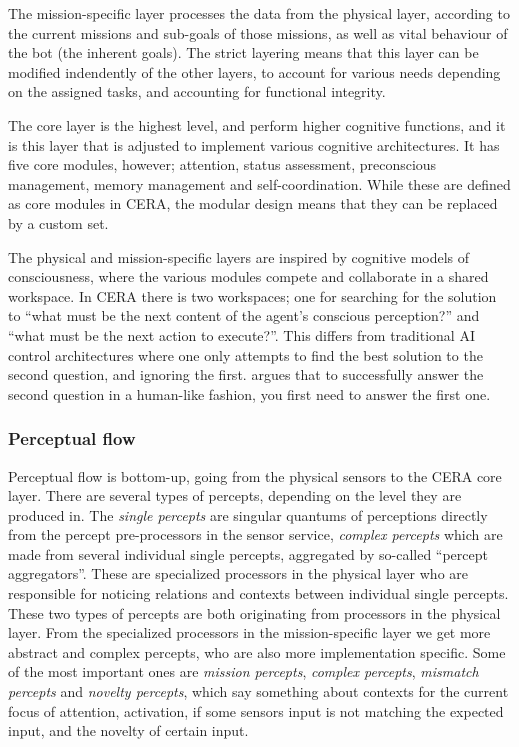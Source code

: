 The mission-specific layer processes the data from the physical layer,
according to the current missions and sub-goals of those missions, as well as
vital behaviour of the bot (the inherent goals). The strict layering means that
this layer can be modified indendently of the other layers, to account for
various needs depending on the assigned tasks, and accounting for functional
integrity.

The core layer is the highest level, and perform higher cognitive functions,
and it is this layer that is adjusted to implement various cognitive
architectures. It has five core modules, however; attention, status assessment,
preconscious management, memory management and self-coordination. While these
are defined as core modules in CERA, the modular design means that they can be
replaced by a custom set.

The physical and mission-specific layers are inspired by cognitive models of
consciousness, where the various modules compete and collaborate in a shared
workspace. In CERA there is two workspaces; one for searching for the solution
to ``what must be the next content of the agent's conscious perception?'' and
``what must be the next action to execute?''. This differs from traditional AI
control architectures where one only attempts to find the best solution to the
second question, and ignoring the first. \cite{arrabales2009ceracranium} argues
that to successfully answer the second question in a human-like fashion, you
first need to answer the first one.

\subsubsection{Perceptual flow}
Perceptual flow is bottom-up, going from the physical sensors to the CERA core
layer. There are several types of percepts, depending on the level they are
produced in. The \textit{single percepts} are singular quantums of perceptions
directly from the percept pre-processors in the sensor service, \textit{complex
percepts} which are made from several individual single percepts, aggregated by
so-called ``percept aggregators''. These are specialized processors in the
physical layer who are responsible for noticing relations and contexts between
individual single percepts. These two types of percepts are both originating
from processors in the physical layer. From the specialized processors in the
mission-specific layer we get more abstract and complex percepts, who are also
more implementation specific. Some of the most important ones are
\textit{mission percepts}, \textit{complex percepts}, \textit{mismatch
percepts} and \textit{novelty percepts}, which say something about contexts for
the current focus of attention, activation, if some sensors input is not
matching the expected input, and the novelty of certain input.

